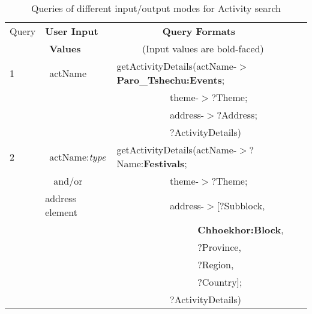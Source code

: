 \begin{table} [tbph]
\caption{Queries of different input/output modes for Activity search}
\centering
\footnotesize
\begin{tabular}{|l|l|l|}
\hline
Query &\textbf{User Input} &$~~~~~~~~~~~~~~~~~~~~$ \textbf{Query Formats} \\
 &$~~$\textbf{Values}   & $~~~~~~~~~~~~$(Input values are bold-faced)      \\
\hline
 1&$~~$actName & getActivityDetails(actName-$>$\textbf{Paro\_Tshechu:Events};\\
  &        &$~~~~~~~~~~~~~~~~~~~~~~~~~$theme-$>?$Theme; \\
  &        &$~~~~~~~~~~~~~~~~~~~~~~~~~$address-$>?$Address; \\
  &        &$~~~~~~~~~~~~~~~~~~~~~~~~~?$ActivityDetails)\\
          
\hline
 2&$~~$actName:\emph{type}& getActivityDetails(actName-$>?$Name:\textbf{Festivals};\\
  &$~~~~$and/or      &$~~~~~~~~~~~~~~~~~~~~~~~~~$theme-$>?$Theme; \\
  & address element      &$~~~~~~~~~~~~~~~~~~~~~~~~~$address-$>$[?Subblock, \\
  &                       &$~~~~~~~~~~~~~~~~~~~~~~~~~~~~~~~~~~~~~~$\textbf{Chhoekhor:Block}, \\
  &                       &$~~~~~~~~~~~~~~~~~~~~~~~~~~~~~~~~~~~~~~?$Province,  \\
  &                       &$~~~~~~~~~~~~~~~~~~~~~~~~~~~~~~~~~~~~~~?$Region, \\
  &                       &$~~~~~~~~~~~~~~~~~~~~~~~~~~~~~~~~~~~~~~?$Country]; \\
  &                 &$~~~~~~~~~~~~~~~~~~~~~~~~~?$ActivityDetails)\\
          

\end{tabular}
\end{table}
